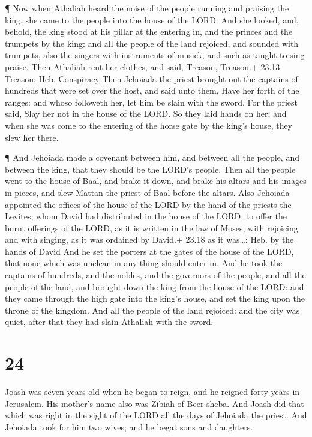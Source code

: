 ¶ Now when Athaliah heard the noise of the people running
and praising the king, she came to the people into the house of the
LORD:  And she looked, and, behold, the king stood at his
pillar at the entering in, and the princes and the trumpets by the king:
and all the people of the land rejoiced, and sounded with trumpets, also
the singers with instruments of musick, and such as taught to sing
praise. Then Athaliah rent her clothes, and said, Treason, Treason.+
23.13 Treason: Heb. Conspiracy  Then Jehoiada the priest
brought out the captains of hundreds that were set over the host, and
said unto them, Have her forth of the ranges: and whoso followeth her,
let him be slain with the sword. For the priest said, Slay her not in
the house of the LORD.  So they laid hands on her; and when
she was come to the entering of the horse gate by the king's house, they
slew her there.

 ¶ And Jehoiada made a covenant between him, and between
all the people, and between the king, that they should be the LORD's
people.  Then all the people went to the house of Baal, and
brake it down, and brake his altars and his images in pieces, and slew
Mattan the priest of Baal before the altars.  Also Jehoiada
appointed the offices of the house of the LORD by the hand of the
priests the Levites, whom David had distributed in the house of the
LORD, to offer the burnt offerings of the LORD, as it is written in the
law of Moses, with rejoicing and with singing, as it was ordained by
David.+ 23.18 as it was\ldots: Heb. by the hands of David 
And he set the porters at the gates of the house of the LORD, that none
which was unclean in any thing should enter in.  And he
took the captains of hundreds, and the nobles, and the governors of the
people, and all the people of the land, and brought down the king from
the house of the LORD: and they came through the high gate into the
king's house, and set the king upon the throne of the kingdom.
 And all the people of the land rejoiced: and the city was
quiet, after that they had slain Athaliah with the sword.

\hypertarget{section-23}{%
\section{24}\label{section-23}}

 Joash was seven years old when he began to reign, and he
reigned forty years in Jerusalem. His mother's name also was Zibiah of
Beer-sheba.  And Joash did that which was right in the sight
of the LORD all the days of Jehoiada the priest.  And
Jehoiada took for him two wives; and he begat sons and daughters.

